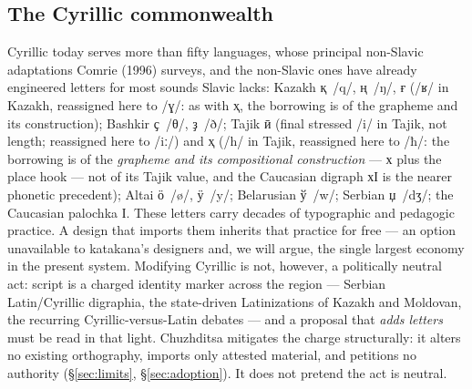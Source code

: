 \documentclass[12pt]{article}
\newcommand{\cz}[1]{{\chu #1}}
\newcommand{\ph}[1]{{\ipafont/#1/}}
\begin{document}
\subsection{The Cyrillic commonwealth}
Cyrillic today serves more than fifty languages, whose principal non-Slavic adaptations Comrie (1996) surveys, and the non-Slavic ones have already engineered letters for most sounds Slavic lacks: Kazakh \cz{қ}~\ph{q}, \cz{ң}~\ph{ŋ}, \cz{ғ} (\ph{ʁ} in Kazakh, reassigned here to \ph{ɣ}: as with \cz{ҳ}, the borrowing is of the grapheme and its construction); Bashkir \cz{ҫ}~\ph{θ}, \cz{ҙ}~\ph{ð}; Tajik \cz{ӣ} (final stressed \ph{i} in Tajik, not length; reassigned here to \ph{iː}) and \cz{ҳ} (\ph{h} in Tajik, reassigned here to \ph{ħ}: the borrowing is of the \emph{grapheme and its compositional construction} — х plus the place hook — not of its Tajik value, and the Caucasian digraph хӀ is the nearer phonetic precedent); Altai \cz{ӧ}~\ph{ø}, \cz{ӱ}~\ph{y}; Belarusian \cz{ў}~\ph{w}; Serbian \cz{џ}~\ph{dʒ}; the Caucasian palochka \cz{Ӏ}. These letters carry decades of typographic and pedagogic practice. A design that imports them inherits that practice for free — an option unavailable to katakana's designers and, we will argue, the single largest economy in the present system. Modifying Cyrillic is not, however, a politically neutral act: script is a charged identity marker across the region — Serbian Latin/Cyrillic digraphia, the state-driven Latinizations of Kazakh and Moldovan, the recurring Cyrillic-versus-Latin debates — and a proposal that \emph{adds letters} must be read in that light. Chuzhditsa mitigates the charge structurally: it alters no existing orthography, imports only attested material, and petitions no authority (\S\ref{sec:limits}, \S\ref{sec:adoption}). It does not pretend the act is neutral.
\end{document}
